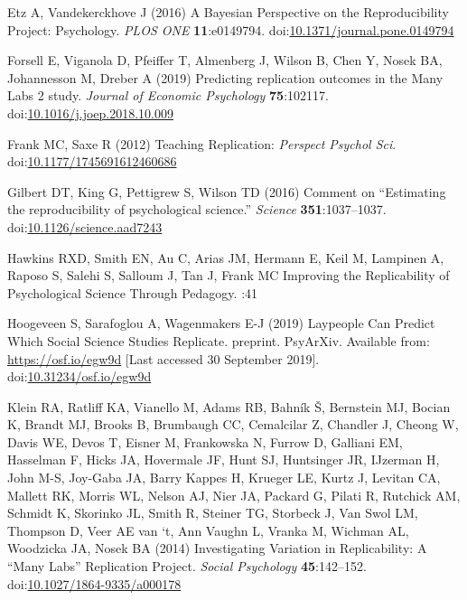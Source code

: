 \documentclass[
  english,
  a4paper,
]{article}
\newlength{\cslhangindent}
\newlength{\cslentryspacingunit} %
\newenvironment{CSLReferences}[2] %
 {%
  \setlength{\parindent}{0pt}
  \ifodd #1
  \let\oldpar\par
  \def\par{\hangindent=\cslhangindent\oldpar}
  \fi
  \setlength{\parskip}{#2\cslentryspacingunit}
 }%
 {}
\begin{document}
\begin{CSLReferences}{1}{0}
\leavevmode{}%
Etz A, Vandekerckhove J (2016) A {Bayesian Perspective} on the {Reproducibility Project}: {Psychology}. \emph{PLOS ONE} \textbf{11}:e0149794. doi:\href{https://doi.org/10.1371/journal.pone.0149794}{10.1371/journal.pone.0149794}

\leavevmode{}%
Forsell E, Viganola D, Pfeiffer T, Almenberg J, Wilson B, Chen Y, Nosek BA, Johannesson M, Dreber A (2019) Predicting replication outcomes in the {Many Labs} 2 study. \emph{Journal of Economic Psychology} \textbf{75}:102117. doi:\href{https://doi.org/10.1016/j.joep.2018.10.009}{10.1016/j.joep.2018.10.009}

\leavevmode{}%
Frank MC, Saxe R (2012) Teaching {Replication}: \emph{Perspect Psychol Sci}. doi:\href{https://doi.org/10.1177/1745691612460686}{10.1177/1745691612460686}

\leavevmode{}%
Gilbert DT, King G, Pettigrew S, Wilson TD (2016) Comment on {``{Estimating} the reproducibility of psychological science.''} \emph{Science} \textbf{351}:1037--1037. doi:\href{https://doi.org/10.1126/science.aad7243}{10.1126/science.aad7243}

\leavevmode{}%
Hawkins RXD, Smith EN, Au C, Arias JM, Hermann E, Keil M, Lampinen A, Raposo S, Salehi S, Salloum J, Tan J, Frank MC Improving the {Replicability} of {Psychological Science Through Pedagogy}. :41

\leavevmode{}%
Hoogeveen S, Sarafoglou A, Wagenmakers E-J (2019) Laypeople {Can Predict Which Social Science Studies Replicate}. preprint. {PsyArXiv}. Available from: \url{https://osf.io/egw9d} {[}Last accessed 30 September 2019{]}. doi:\href{https://doi.org/10.31234/osf.io/egw9d}{10.31234/osf.io/egw9d}

\leavevmode{}%
Klein RA, Ratliff KA, Vianello M, Adams RB, Bahník Š, Bernstein MJ, Bocian K, Brandt MJ, Brooks B, Brumbaugh CC, Cemalcilar Z, Chandler J, Cheong W, Davis WE, Devos T, Eisner M, Frankowska N, Furrow D, Galliani EM, Hasselman F, Hicks JA, Hovermale JF, Hunt SJ, Huntsinger JR, IJzerman H, John M-S, Joy-Gaba JA, Barry Kappes H, Krueger LE, Kurtz J, Levitan CA, Mallett RK, Morris WL, Nelson AJ, Nier JA, Packard G, Pilati R, Rutchick AM, Schmidt K, Skorinko JL, Smith R, Steiner TG, Storbeck J, Van Swol LM, Thompson D, Veer AE van `t, Ann Vaughn L, Vranka M, Wichman AL, Woodzicka JA, Nosek BA (2014) Investigating {Variation} in {Replicability}: {A} {``{Many Labs}''} {Replication Project}. \emph{Social Psychology} \textbf{45}:142--152. doi:\href{https://doi.org/10.1027/1864-9335/a000178}{10.1027/1864-9335/a000178}


\end{CSLReferences}
\end{document}
